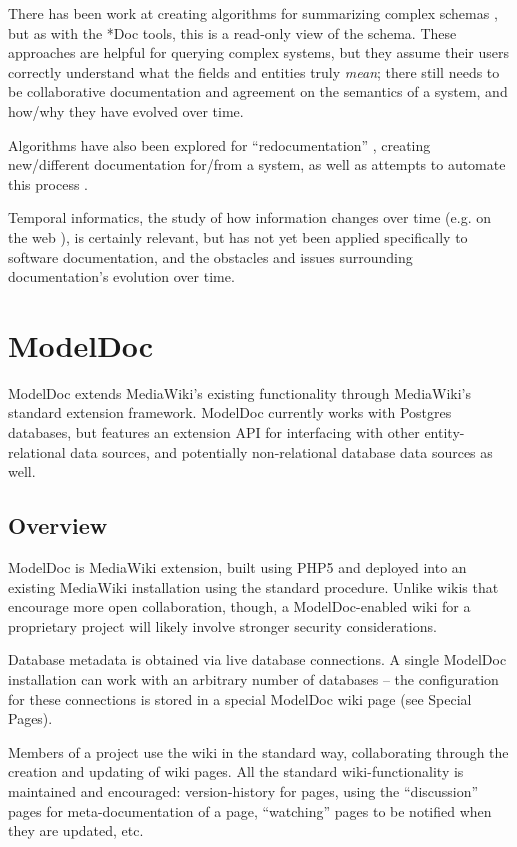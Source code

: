 \documentclass{acm_proc_article-sp}
\begin{document}
There has been work at creating algorithms for summarizing complex schemas
\cite{jag:summarization} \cite{yang:summarizing}, but as with the *Doc tools,
this is a read-only view of the schema.  These approaches are helpful for
querying complex systems, but they assume their users correctly understand
what the fields and entities truly \textit{mean}; there still needs to be
collaborative documentation and agreement on the semantics of a system, and
how/why they have evolved over time.

Algorithms have also been explored for ``redocumentation''
\cite{rajlich:webredoc}, creating new/different documentation for/from a
system, as well as attempts to automate this process \cite{anquetil:atool}.

Temporal informatics, the study of how information changes over time (e.g. on
the web \cite{adar:zoetrope}), is certainly relevant, but has not yet been
applied specifically to software documentation, and the obstacles and issues
surrounding documentation's evolution over time.

\section{ModelDoc}

ModelDoc extends MediaWiki's existing functionality through MediaWiki's
standard extension framework.  ModelDoc currently works with Postgres
databases, but features an extension API for interfacing with other
entity-relational data sources, and potentially non-relational database data
sources as well.

\subsection{Overview}

ModelDoc is MediaWiki extension, built using PHP5 and deployed into an existing
MediaWiki installation using the standard procedure.  Unlike wikis that
encourage more open collaboration, though, a ModelDoc-enabled wiki for a
proprietary project will likely involve stronger security considerations.

Database metadata is obtained via live database connections.  A single ModelDoc
installation can work with an arbitrary number of databases -- the
configuration for these connections is stored in a special ModelDoc wiki page
(see Special Pages).

Members of a project use the wiki in the standard way, collaborating through
the creation and updating of wiki pages.  All the standard wiki-functionality
is maintained and encouraged: version-history for pages, using the
``discussion'' pages for meta-documentation of a page, ``watching'' pages to be
notified when they are updated, etc.
\end{document}
